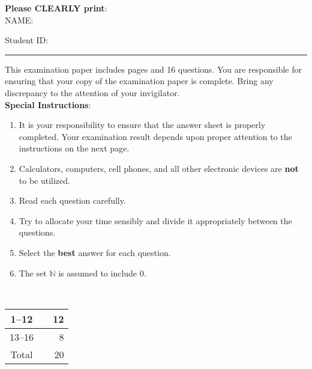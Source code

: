 \documentclass[12pt,fleqn]{examtst}
\begin{document}
\begin{minipage}[t]{1.0\textwidth}
\textbf{Please CLEARLY print}:\\[2mm]

NAME:\\[1ex]

\newsavebox{\bb}\newsavebox{\bbb}
\sbox{\bb}{\framebox[1cm]{\rule{0mm}{7mm}}}
\sbox{\bbb}{\usebox{\bb}\usebox{\bb}\usebox{\bb}\usebox{\bb}\usebox{\bb}\usebox{\bb}\usebox{\bb}\usebox{\bb}\usebox{\bb}}

Student ID: \usebox{\bbb} \\[2mm]

\rule[3 mm]{\textwidth}{0.5mm}

This examination paper includes \noofpages pages and
16 %
questions. You are responsible for ensuring that your copy of the examination
paper is complete. Bring any discrepancy to the attention
of your invigilator.\\

\textbf{Special Instructions}:

\begin{enumerate}

\item It is your responsibility to ensure that the answer sheet is properly
  completed. Your examination result depends upon proper attention to the
  instructions on the next page.
\item Calculators, computers, cell phones, and all other electronic devices are
  \textbf{not} to be utilized.
\item Read each question carefully.
\item Try to allocate your time sensibly and divide it appropriately between the
  questions.
\item Select the \textbf{best} answer for each question.
\item The set $\mathbb{N}$ is assumed to include $0$.
\end{enumerate}
\end{minipage}\\

\hspace{14cm}
\begin{minipage}[t]{0.2\textwidth}
\newcommand{\markheight}{\rule[-2mm]{0 mm}{7 mm}}
\begin{tabular}[t]{|c|p{1.5 cm}|r|}
\hline
1--12 & \markheight & 12\\
\hline
13--16 & \markheight & 8\\

\hline
Total & \markheight & 20 \\
\hline

\end{tabular}
\end{minipage}
\end{document}
